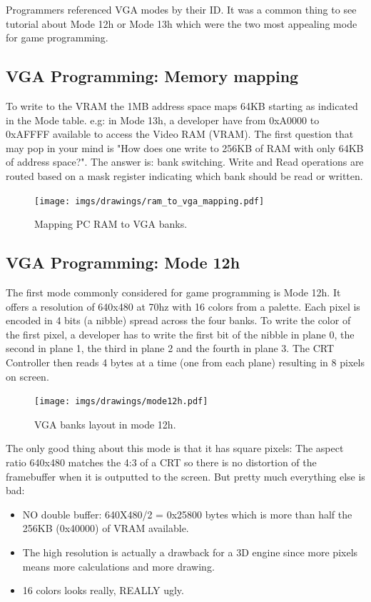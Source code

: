 \documentclass[book.tex]{subfiles}
\begin{document}
 Programmers referenced VGA modes by their ID. It was a common thing to see tutorial about Mode 12h or Mode 13h which were the two most appealing mode for game programming.


 \subsection{VGA Programming: Memory mapping}
To write to the VRAM the 1MB address space maps 64KB starting as indicated in the Mode table. e.g: in Mode 13h, a developer have from 0xA0000 to 0xAFFFF available to access the Video RAM (VRAM). The first question that may pop in your mind is "How does one write to 256KB of RAM with only 64KB of address space?". The answer is: bank switching. Write and Read operations are routed based on a mask register indicating which bank should be read or written.\\
\par
 \begin{figure}[H]
\centering
  
      \texttt{[image: imgs/drawings/ram\_to\_vga\_mapping.pdf]}
    
\caption{Mapping PC RAM to VGA banks.}
\end{figure}



 

 \subsection{VGA Programming: Mode 12h}
 The first mode commonly considered for game programming is Mode 12h. It offers a resolution of 640x480 at 70hz with 16 colors from a palette. Each pixel is encoded in 4 bits (a nibble) spread across the four banks. To write the color of the first pixel, a developer has to write the first bit of the nibble in plane 0, the second in plane 1, the third in plane 2 and the fourth in plane 3. The CRT Controller then reads 4 bytes at a time (one from each plane) resulting in 8 pixels on screen.\\
\par
\begin{figure}[H]
\centering
 \texttt{[image: imgs/drawings/mode12h.pdf]}
\caption{VGA banks layout in mode 12h.}
\end{figure}
\par

The only good thing about this mode is that it has square pixels: The aspect ratio 640x480 matches the 4:3 of a CRT so there is no distortion of the framebuffer when it is outputted to the screen. But pretty much everything else is bad:\\
\begin{itemize}
\item NO double buffer: 640X480/2 = 0x25800 bytes which is more than half the 256KB (0x40000) of VRAM available.
\item The high resolution is actually a drawback for a 3D engine since more pixels means more calculations and more drawing.
\item 16 colors looks really, REALLY ugly.
\end{itemize}
\end{document}
